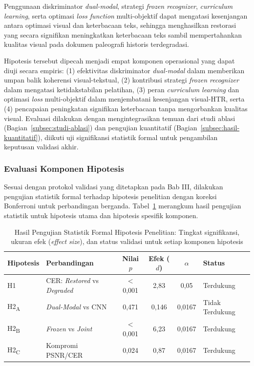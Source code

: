 \documentclass[12pt,a4paper]{article}
\begin{document}
Penggunaan diskriminator \textit{dual-modal}, strategi \textit{frozen recognizer}, \textit{curriculum learning}, serta optimasi \textit{loss function} multi-objektif dapat mengatasi kesenjangan antara optimasi visual dan keterbacaan teks, sehingga menghasilkan restorasi yang secara signifikan meningkatkan keterbacaan teks sambil mempertahankan kualitas visual pada dokumen paleografi historis terdegradasi.

Hipotesis tersebut dipecah menjadi empat komponen operasional yang dapat diuji secara empiris: (1) efektivitas diskriminator \textit{dual-modal} dalam memberikan umpan balik koherensi visual-tekstual, (2) kontribusi strategi \textit{frozen recognizer} dalam mengatasi ketidakstabilan pelatihan, (3) peran \textit{curriculum learning} dan optimasi \textit{loss} multi-objektif dalam menjembatani kesenjangan visual-HTR, serta (4) pencapaian peningkatan signifikan keterbacaan tanpa mengorbankan kualitas visual. Evaluasi dilakukan dengan mengintegrasikan temuan dari studi ablasi (Bagian~\ref{subsec:studi-ablasi}) dan pengujian kuantitatif (Bagian~\ref{subsec:hasil-kuantitatif}), diikuti uji signifikansi statistik formal untuk pengambilan keputusan validasi akhir.

\subsubsection{Evaluasi Komponen Hipotesis}
\label{subsubsec:evaluasi-komponen-hipotesis}

Sesuai dengan protokol validasi yang ditetapkan pada Bab III, dilakukan pengujian statistik formal terhadap hipotesis penelitian dengan koreksi Bonferroni untuk perbandingan berganda. Tabel~\ref{tab:hypothesis-validation} merangkum hasil pengujian statistik untuk hipotesis utama dan hipotesis spesifik komponen.

\begin{table}[!htbp]
    \caption[Hasil pengujian statistik formal hipotesis penelitian]{Hasil Pengujian Statistik Formal Hipotesis Penelitian: Tingkat signifikansi, ukuran efek (\textit{effect size}), dan status validasi untuk setiap komponen hipotesis}
    \label{tab:hypothesis-validation}
    \small
    \begin{tabular}{|l|p{3.2cm}|c|c|c|p{2.5cm}|}
        \hline
        \textbf{Hipotesis} & \textbf{Perbandingan} & \textbf{Nilai $p$} & \textbf{Efek ($d$)} & \textbf{$\alpha$} & \textbf{Status} \\
        \hline
        H1 & CER: \textit{Restored} vs \textit{Degraded} & $<$0,001 & 2,83 & 0,05 & Terdukung \\
        H2\textsubscript{A} & \textit{Dual-Modal} vs CNN & 0,471 & 0,146 & 0,0167 & Tidak Terdukung \\
        H2\textsubscript{B} & \textit{Frozen} vs \textit{Joint} & $<$0,001 & 6,23 & 0,0167 & Terdukung \\
        H2\textsubscript{C} & Kompromi PSNR/CER & 0,024 & 0,87 & 0,0167 & Terdukung \\
        \hline
    \end{tabular}
\end{table}
\end{document}
